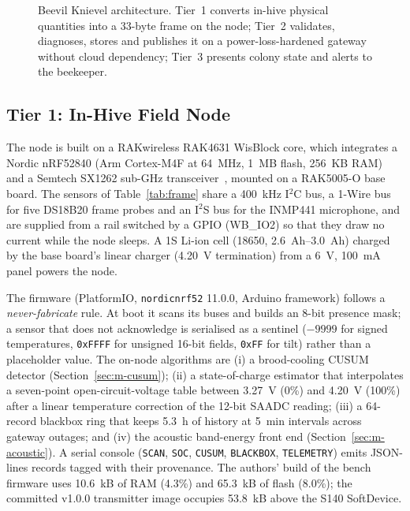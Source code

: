 \documentclass[conference]{IEEEtran}
\begin{document}
\begin{figure}[!t]
{}
\caption{Beevil Knievel architecture. Tier~1 converts in-hive physical quantities into a 33-byte frame on the node; Tier~2 validates, diagnoses, stores and publishes it on a power-loss-hardened gateway without cloud dependency; Tier~3 presents colony state and alerts to the beekeeper.}
\label{fig:arch}
\end{figure}

\subsection{Tier 1: In-Hive Field Node}\label{sec:node}
The node is built on a RAKwireless RAK4631 WisBlock core, which integrates a Nordic nRF52840 (Arm Cortex-M4F at \SI{64}{MHz}, \SI{1}{MB} flash, \SI{256}{KB} RAM)~\cite{nrf52840ps} and a Semtech SX1262 sub-GHz transceiver~\cite{sx1262ds,rak4631ds}, mounted on a RAK5005-O base board. The sensors of Table~\ref{tab:frame} share a \SI{400}{kHz} I$^2$C bus, a 1-Wire bus for five DS18B20 frame probes and an I$^2$S bus for the INMP441 microphone, and are supplied from a rail switched by a GPIO (WB\_IO2) so that they draw no current while the node sleeps. A 1S Li-ion cell (18650, \SIrange{2.6}{3.0}{Ah}) charged by the base board's linear charger (\SI{4.20}{V} termination) from a \SI{6}{V}, \SI{100}{mA} panel powers the node.

The firmware (PlatformIO, \texttt{nordicnrf52} 11.0.0, Arduino framework) follows a \emph{never-fabricate} rule. At boot it scans its buses and builds an 8-bit presence mask; a sensor that does not acknowledge is serialised as a sentinel ($-9999$ for signed temperatures, \texttt{0xFFFF} for unsigned 16-bit fields, \texttt{0xFF} for tilt) rather than a placeholder value. The on-node algorithms are (i) a brood-cooling CUSUM detector (Section~\ref{sec:m-cusum}); (ii) a state-of-charge estimator that interpolates a seven-point open-circuit-voltage table between \SI{3.27}{V} (0\%) and \SI{4.20}{V} (100\%) after a linear temperature correction of the 12-bit SAADC reading; (iii) a 64-record blackbox ring that keeps \SI{5.3}{h} of history at \SI{5}{min} intervals across gateway outages; and (iv) the acoustic band-energy front end (Section~\ref{sec:m-acoustic}). A serial console (\texttt{SCAN}, \texttt{SOC}, \texttt{CUSUM}, \texttt{BLACKBOX}, \texttt{TELEMETRY}) emits JSON-lines records tagged with their provenance. The authors' build of the bench firmware uses \SI{10.6}{kB} of RAM (4.3\%) and \SI{65.3}{kB} of flash (8.0\%); the committed v1.0.0 transmitter image occupies \SI{53.8}{kB} above the S140 SoftDevice.
\end{document}
